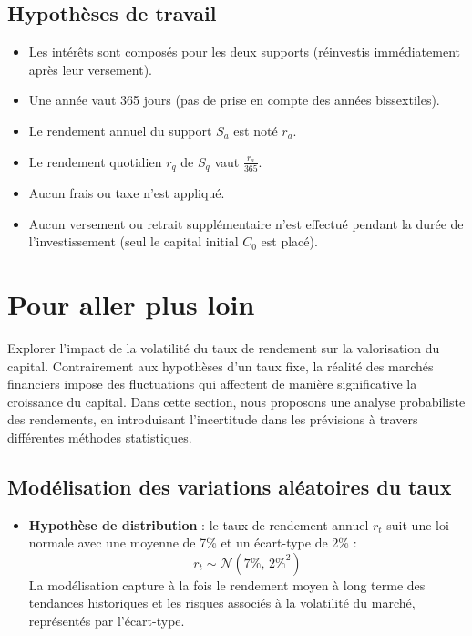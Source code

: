 \documentclass{article}
\begin{document}
\subsection{Hypothèses de travail}
\begin{itemize}
\item Les intérêts sont composés pour les deux supports (réinvestis immédiatement après leur versement).
\item Une année vaut 365 jours (pas de prise en compte des années bissextiles).
\item Le rendement annuel du support $S_a$  est noté $r_a$.
\item Le rendement quotidien $r_q$ de $S_q$ vaut $\frac{r_a}{365}$.
\item Aucun frais ou taxe n'est appliqué.
\item Aucun versement ou retrait supplémentaire n’est effectué pendant la durée de l’investissement (seul le capital initial $C_0$ est placé).
\end{itemize}

\section{Pour aller plus loin}

Explorer l'impact de la volatilité du taux de rendement sur la valorisation du capital. Contrairement aux hypothèses d’un taux fixe, la réalité des marchés financiers impose des fluctuations qui affectent de manière significative la croissance du capital. Dans cette section, nous proposons une analyse probabiliste des rendements, en introduisant l'incertitude dans les prévisions à travers différentes méthodes statistiques.

\subsection{Modélisation des variations aléatoires du taux}
\begin{itemize}
    \item \textbf{Hypothèse de distribution} :  
    le taux de rendement annuel \( r_t \) suit une loi normale avec une moyenne de 7\% et un écart-type de 2\% :  
    \[
    r_t \sim \mathcal{N}(7\%, \, 2\%^2)
    \]
    La modélisation capture à la fois le rendement moyen à long terme des tendances historiques et les risques associés à la volatilité du marché, représentés par l'écart-type.
\end{itemize}
\end{document}
